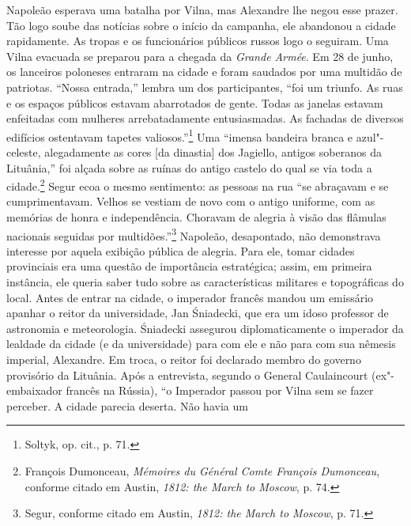 %

Napoleão esperava uma batalha por Vilna, mas Alexandre lhe negou esse
prazer. Tão logo soube das notícias sobre o início da campanha, ele
abandonou a cidade rapidamente. As tropas e os funcionários públicos
russos logo o seguiram. Uma Vilna evacuada se preparou para a chegada da
\textit{Grande Armée}. Em 28 de junho, os lanceiros poloneses entraram na
cidade e foram saudados por uma multidão de patriotas. ``Nossa
entrada,'' lembra um dos participantes, ``foi um triunfo. As ruas e os
espaços públicos estavam abarrotados de gente. Todas as janelas estavam
enfeitadas com mulheres arrebatadamente entusiasmadas. As fachadas de
diversos edifícios ostentavam tapetes valiosos.''\footnote{Soltyk, op. cit., p. 71.} Uma ``imensa bandeira branca e azul"-celeste, alegadamente as cores {[}da dinastia{]} dos Jagiello, antigos soberanos
da Lituânia,'' foi alçada sobre as ruínas do antigo castelo do qual se
via toda a cidade.\footnote{François Dumonceau, \textit{Mémoires du Général Comte François Dumonceau}, conforme citado em Austin, \textit{1812: the March to Moscow}, p. 74.} Segur ecoa o mesmo sentimento: as pessoas na rua ``se abraçavam e se cumprimentavam. Velhos
se vestiam de novo com o antigo uniforme, com as memórias de honra e
independência. Choravam de alegria à visão das flâmulas nacionais
seguidas por multidões.''\footnote{Segur, conforme citado em Austin, \textit{1812: the March to Moscow}, p. 71.} Napoleão, desapontado, não demonstrava interesse por aquela exibição pública de alegria. Para ele,
tomar cidades provinciais era uma questão de importância estratégica;
assim, em primeira instância, ele queria saber tudo sobre as
características militares e topográficas do local. Antes de entrar na
cidade, o imperador francês mandou um emissário apanhar o reitor da
universidade, Jan Śniadecki, que era um idoso professor de astronomia e
meteorologia. Śniadecki assegurou diplomaticamente o imperador da
lealdade da cidade (e da universidade) para com ele e não para com sua
nêmesis imperial, Alexandre. Em troca, o reitor foi declarado membro do
governo provisório da Lituânia. Após a entrevista, segundo o General
Caulaincourt (ex"-embaixador francês na Rússia), ``o Imperador passou por
Vilna sem se fazer perceber. A cidade parecia deserta. Não havia um
